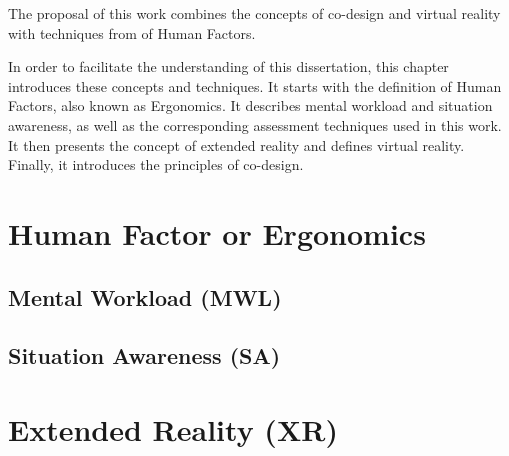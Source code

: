 
The proposal of this work combines the concepts of co-design and virtual reality with techniques from of Human Factors. 

In order to facilitate the understanding of this dissertation, this chapter introduces these concepts and techniques. It starts with the definition of Human Factors, also known as Ergonomics. It describes mental workload and situation awareness, as well as the corresponding assessment techniques used in this work. It then presents the concept of extended reality and defines virtual reality. Finally, it introduces the principles of co-design.

\section{Human Factor or Ergonomics}
\label{sec:human_factors}

    

\subsection{Mental Workload (MWL)}
\label{sec:mental_workload}

    

\subsection{Situation Awareness (SA)}
\label{sec:situation_awareness}

    

\section{Extended Reality (XR)}
\label{sec:extended_reality}

